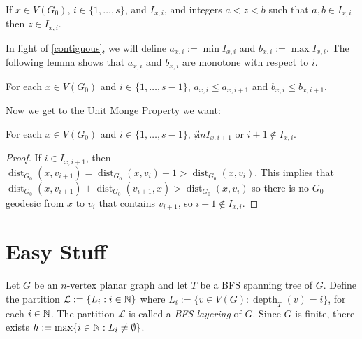 \documentclass{patmorin}
\DeclareMathOperator{\dist}{dist}
\DeclareMathOperator{\depth}{depth}
\begin{document}
\begin{obs}\label{contiguous}
    If $x\in V(G_0)$, $i\in\{1,\ldots,s\}$, and $I_{x,i}$, and integers $a <z <b$ such that $a,b\in I_{x,i}$ then $z\in I_{x,i}$.
\end{obs}

In light of \cref{contiguous}, we will define $a_{x,i}:=\min I_{x,i}$ and $b_{x,i}:=\max I_{x,i}$. The following lemma shows that $a_{x,i}$ and $b_{x,i}$ are monotone with respect to $i$.

\begin{obs}\label{monotone}
    For each $x\in V(G_0)$ and $i\in\{1,\ldots,s-1\}$, $a_{x,i} \le a_{x,i+1}$ and $b_{x,i}\le b_{x, i+1}$.
\end{obs}

Now we get to the Unit Monge Property we want:

\begin{obs}
    For each $x\in V(G_0)$ and $i\in\{1,\ldots,s-1\}$, $i\not in I_{x,i+1}$ or $i+1\not\in I_{x,i}$.
\end{obs}

\begin{proof}
    If $i\in I_{x,i+1}$, then $\dist_{G_0}(x,v_{i+1}) = \dist_{G_0}(x,v_i)+1 > \dist_{G_0}(x,v_i)$.  This implies that $\dist_{G_0}(x,v_{i+1})+\dist_{G_0}(v_{i+1},x)>\dist_{G_0}(x,v_i)$ so there is no $G_0$-geodesic from $x$ to $v_i$ that contains $v_{i+1}$, so $i+1\not\in I_{x,i}$.
\end{proof}












\section{Easy Stuff}

Let $G$ be an $n$-vertex planar graph and let $T$ be a BFS spanning tree of $G$. Define the partition $\mathcal{L}:=\{L_i: i\in\mathbb{N}\}$ where $L_i:=\{v\in V(G):\depth_T(v)=i\}$, for each $i\in \mathbb{N}$.  The partition $\mathcal{L}$ is called a \emph{BFS layering} of $G$.  Since $G$ is finite, there exists $h:=\max\{i\in\mathbb{N}:L_i\neq\emptyset\}$.
\end{document}
